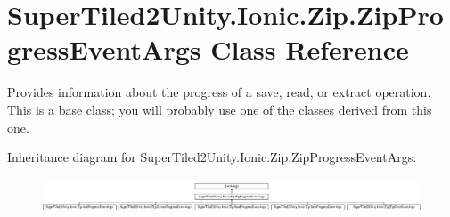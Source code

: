 \hypertarget{class_super_tiled2_unity_1_1_ionic_1_1_zip_1_1_zip_progress_event_args}{}\section{Super\+Tiled2\+Unity.\+Ionic.\+Zip.\+Zip\+Progress\+Event\+Args Class Reference}
\label{class_super_tiled2_unity_1_1_ionic_1_1_zip_1_1_zip_progress_event_args}


Provides information about the progress of a save, read, or extract operation. This is a base class; you will probably use one of the classes derived from this one.  


Inheritance diagram for Super\+Tiled2\+Unity.\+Ionic.\+Zip.\+Zip\+Progress\+Event\+Args\+:\begin{figure}[H]
\begin{center}
\leavevmode
\includegraphics[height=1.040248cm]{class_super_tiled2_unity_1_1_ionic_1_1_zip_1_1_zip_progress_event_args}
\end{center}
\end{figure}
